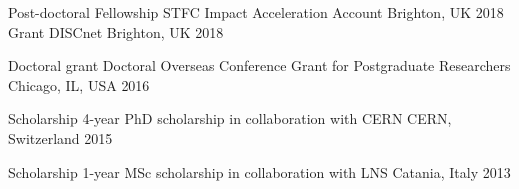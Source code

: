 
\begin{cvhonors}
  \cvhonor 
      {Post-doctoral Fellowship}
      {STFC Impact Acceleration Account}
      {Brighton, UK}
      {2018}
  \cvhonor 
      {Grant}
      {DISCnet}
      {Brighton, UK}
      {2018}

  \cvhonor
      {Doctoral grant}
      {Doctoral Overseas Conference Grant for Postgraduate Researchers}
      {Chicago, IL, USA}
      {2016}

  \cvhonor
      {Scholarship}
      {4-year PhD scholarship in collaboration with CERN}
      {CERN, Switzerland}
      {2015}

  \cvhonor
      {Scholarship}
      {1-year MSc scholarship in collaboration with LNS}
      {Catania, Italy}
      {2013}
\end{cvhonors}
